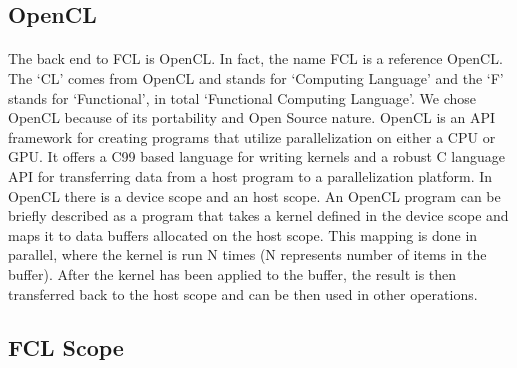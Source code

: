 \documentclass{article}
\begin{document}
\subsection{OpenCL}
\paragraph{}
The back end to FCL is OpenCL. In fact, the name FCL is a reference OpenCL.
The `CL' comes from OpenCL and stands for `Computing Language' and the `F' stands
for `Functional', in total `Functional Computing Language'. We chose OpenCL because
of its portability and Open Source nature.  OpenCL is an API framework for
creating programs that utilize parallelization on either a CPU or GPU. It offers
a C99 based language for writing kernels and a robust C language API
for transferring data from a host program to a parallelization platform.
In OpenCL there is a device scope and an host scope. An OpenCL
program can be briefly described as a program that takes a kernel defined in the device scope and
 maps it to data buffers allocated on the host scope. This mapping is done in parallel,
where the kernel is run N times (N represents number of items in the buffer). After
the kernel has been applied to the buffer, the result is then transferred back to
the host scope and can be then used in other operations.


\subsection{FCL Scope}
\end{document}
